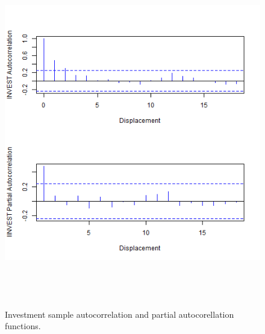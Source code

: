 \begin{figure}[H] 
\centering
\includegraphics[width=5in, height=6in]{figures/invest-acf}
\captionsetup{justification=centering, width=.95\textwidth} 
\caption{\footnotesize Investment sample autocorrelation and partial autocorellation functions.} \label{invest-acf}
\end{figure} 
 \newpage 

